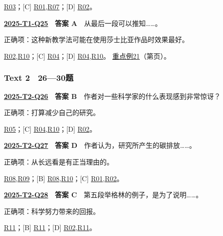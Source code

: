 \documentclass[11pt,a4paper]{article}
\begin{document}
\noindent [A] \hyperref[cat-R03]{R03}；[C] \hyperref[cat-R01]{R01},\hyperref[cat-R07]{R07}；[D] \hyperref[cat-R02]{R02}。
\par\smallskip
{}\label{idx-2025-T1-Q25}
\noindent\textbf{\href{https://zj139.github.io/math-notes/english/cabb22521ad878901633c3a3/\#q25}{2025-T1-Q25}　答案 A}　从最后一段可以推知……。\par\nopagebreak
\noindent 正确项：这种新教学法可能在使用莎士比亚作品时效果最好。\par\nopagebreak
\noindent [B] \hyperref[cat-R02]{R02},\hyperref[cat-R10]{R10}；[C] \hyperref[cat-R04]{R04}；[D] \hyperref[cat-R04]{R04},\hyperref[cat-R10]{R10}。
\hyperref[case-2025-T1-Q25]{重点例21}（第\pageref{case-2025-T1-Q25}页）。
\par\smallskip
\subsubsection{Text 2　26—30题}
\label{idx-2025-T2-Q26}
\noindent\textbf{\href{https://zj139.github.io/math-notes/english/b852b5bb77b21d41f0543171/\#q26}{2025-T2-Q26}　答案 B}　作者对一些科学家的什么表现感到非常惊讶？\par\nopagebreak
\noindent 正确项：打算减少自己的研究。\par\nopagebreak
\noindent [A] \hyperref[cat-R05]{R05}；[C] \hyperref[cat-R04]{R04},\hyperref[cat-R10]{R10}；[D] \hyperref[cat-R02]{R02}。
\par\smallskip
{}\label{idx-2025-T2-Q27}
\noindent\textbf{\href{https://zj139.github.io/math-notes/english/b852b5bb77b21d41f0543171/\#q27}{2025-T2-Q27}　答案 D}　作者认为，研究所产生的碳排放……。\par\nopagebreak
\noindent 正确项：从长远看是有正当理由的。\par\nopagebreak
\noindent [A] \hyperref[cat-R08]{R08},\hyperref[cat-R09]{R09}；[B] \hyperref[cat-R08]{R08},\hyperref[cat-R10]{R10}；[C] \hyperref[cat-R01]{R01},\hyperref[cat-R02]{R02}。
\par\smallskip
{}\label{idx-2025-T2-Q28}
\noindent\textbf{\href{https://zj139.github.io/math-notes/english/b852b5bb77b21d41f0543171/\#q28}{2025-T2-Q28}　答案 C}　第五段举格林的例子，是为了说明……。\par\nopagebreak
\noindent 正确项：科学努力带来的回报。\par\nopagebreak
\noindent [A] \hyperref[cat-R11]{R11}；[B] \hyperref[cat-R11]{R11}；[D] \hyperref[cat-R02]{R02},\hyperref[cat-R11]{R11}。
\end{document}
